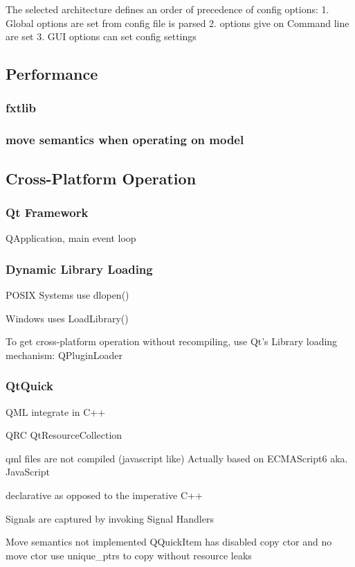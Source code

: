 The selected architecture defines an order of precedence of config options:
1. Global options are set from config file is parsed
2. options give on Command line are set 
3. GUI options can set config settings

\subsection{Performance}
\subsubsection{fxtlib}
\subsubsection{move semantics when operating on model}

\subsection{Cross-Platform Operation}
\subsubsection{Qt Framework}
QApplication, main event loop

\subsubsection{Dynamic Library Loading}
POSIX Systems use dlopen()

Windows uses LoadLibrary()

To get cross-platform operation without recompiling, use Qt's Library loading mechanism: QPluginLoader

\subsubsection{QtQuick}
QML integrate in C++

QRC QtResourceCollection

qml files are not compiled (javascript like)
Actually based on ECMAScript6 aka. JavaScript

declarative as opposed to the imperative  C++

Signals are captured by invoking Signal Handlers

Move semantics not implemented
QQuickItem has disabled copy ctor and no move ctor
use unique_ptrs to copy without resource leaks


